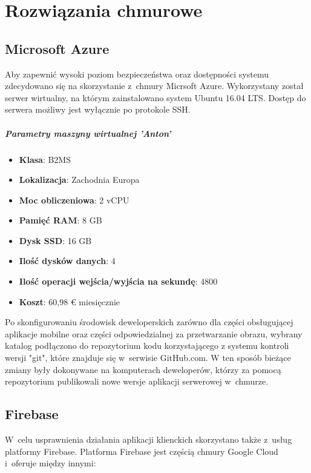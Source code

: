 \chapter{Rozwiązania chmurowe}

\section{Microsoft Azure}

Aby zapewnić wysoki poziom bezpieczeństwa oraz dostępności systemu zdecydowano się na skorzystanie z~chmury Micrsoft Azure.
Wykorzystany został serwer wirtualny, na którym zainstalowano system Ubuntu 16.04 LTS. Dostęp do serwera możliwy jest wyłącznie po protokole SSH.

\paragraph{Parametry maszyny wirtualnej 'Anton'}
\begin{itemize}
    \item \textbf{Klasa}: B2MS
    \item \textbf{Lokalizacja}: Zachodnia Europa
    \item \textbf{Moc obliczeniowa}: 2 vCPU
    \item \textbf{Pamięć RAM}: 8 GB
    \item \textbf{Dysk SSD}: 16 GB
    \item \textbf{Ilość dysków danych}: 4
    \item \textbf{Ilość operacji wejścia/wyjścia na sekundę}: 4800
    \item \textbf{Koszt}: 60,98 € miesięcznie
\end{itemize}

Po skonfigurowaniu środowisk deweloperskich zarówno dla części obsługującej aplikacje mobilne oraz części odpowiedzialnej za przetwarzanie obrazu, wybrany katalog podłączono do repozytorium kodu korzystającego z systemu kontroli wersji "git", które znajduje się w~serwisie GitHub.com.
W ten sposób bieżące zmiany były dokonywane na komputerach deweloperów, którzy za pomocą repozytorium publikowali nowe wersje aplikacji serwerowej w~chmurze.

\section{Firebase}

W~celu usprawnienia działania aplikacji klienckich skorzystano także z~usług platformy Firebase. Platforma Firebase jest częścią chmury Google Cloud i~oferuje między innymi:

